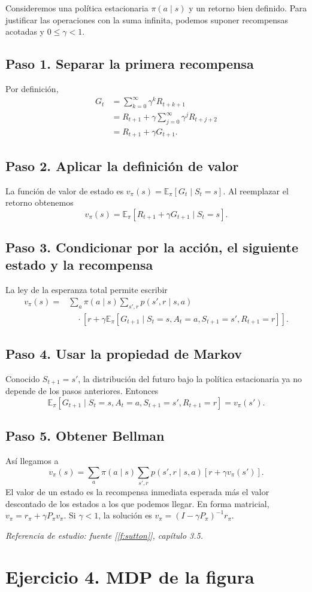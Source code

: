 \documentclass[11pt,a4paper]{article}
\newcommand{\E}{\mathbb{E}}
\newcommand{\apartado}[1]{\subsection*{#1}}
\begin{document}
Consideremos una política estacionaria $\pi(a\mid s)$ y un retorno bien definido. Para justificar las operaciones con la suma infinita, podemos suponer recompensas acotadas y $0\leq\gamma<1$.

\apartado{Paso 1. Separar la primera recompensa}
Por definición,
\begin{align*}
G_t&=\sum_{k=0}^{\infty}\gamma^kR_{t+k+1}\\
&=R_{t+1}+\gamma\sum_{j=0}^{\infty}\gamma^jR_{t+j+2}\\
&=R_{t+1}+\gamma G_{t+1}.
\end{align*}

\apartado{Paso 2. Aplicar la definición de valor}
La función de valor de estado es $v_\pi(s)=\E_\pi[G_t\mid S_t=s]$. Al reemplazar el retorno obtenemos
\[
v_\pi(s)=\E_\pi[R_{t+1}+\gamma G_{t+1}\mid S_t=s].
\]

\apartado{Paso 3. Condicionar por la acción, el siguiente estado y la recompensa}
La ley de la esperanza total permite escribir
\begin{align*}
v_\pi(s)
={}&\sum_a\pi(a\mid s)\sum_{s',r}p(s',r\mid s,a)\\
&\quad\cdot\left[r+\gamma\E_\pi[G_{t+1}\mid S_t=s,A_t=a,S_{t+1}=s',R_{t+1}=r]\right].
\end{align*}

\apartado{Paso 4. Usar la propiedad de Markov}
Conocido $S_{t+1}=s'$, la distribución del futuro bajo la política estacionaria ya no depende de los pasos anteriores. Entonces
\[
\E_\pi[G_{t+1}\mid S_t=s,A_t=a,S_{t+1}=s',R_{t+1}=r]=v_\pi(s').
\]

\apartado{Paso 5. Obtener Bellman}
Así llegamos a
\[
\boxed{v_\pi(s)=\sum_a\pi(a\mid s)\sum_{s',r}p(s',r\mid s,a)
\left[r+\gamma v_\pi(s')\right].}
\]
El valor de un estado es la recompensa inmediata esperada más el valor descontado de los estados a los que podemos llegar. En forma matricial, $v_\pi=r_\pi+\gamma P_\pi v_\pi$. Si $\gamma<1$, la solución es $v_\pi=(I-\gamma P_\pi)^{-1}r_\pi$.

\textit{Referencia de estudio: fuente [\ref{f:sutton}], capítulo 3.5.}

\section{Ejercicio 4. MDP de la figura}
\end{document}
